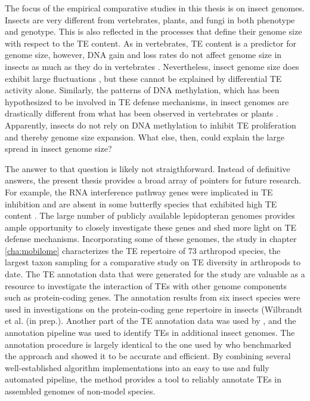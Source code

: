 The focus of the empirical comparative studies in this thesis is on
insect genomes. Insects are very different from vertebrates, plants, and
fungi in both phenotype and genotype. This is also reflected in the
processes that define their genome size with respect to the TE content.
As in vertebrates, TE content is a predictor for genome size, however,
DNA gain and loss rates do not affect genome size in insects as much as
they do in vertebrates \citep{Kapusta2017a, Lindblad-Toh2005}.
Nevertheless, insect genome size does exhibit large fluctuations
\citep{Alfsnes2017}, but these cannot be explained by differential TE
activity alone.  Similarly, the patterns of DNA methylation, which has
been hypothesized to be involved in TE defense mechanisms, in insect
genomes are drastically different from what has been observed in
vertebrates or plants \citep{Provataris2018, Suzuki2008}. Apparently,
insects do not rely on DNA methylation to inhibit TE proliferation and
thereby genome size expansion. What else, then, could explain the large
spread in insect genome size?

The answer to that question is likely not straigthforward. Instead of
definitive answers, the present thesis provides a broad array of
pointers for future research. For example, the RNA interference pathway
genes were implicated in TE inhibition \citep{Aravin2001, Czech2008} and
are absent in some butterfly species that exhibited high TE content
\citep{Dowling2017}. The large number of publicly available lepidopteran
genomes provides ample opportunity to closely investigate these genes
and shed more light on TE defense mechanisms. Incorporating some of
these genomes, the study in chapter \ref{cha:mobilome} characterizes the
TE repertoire of 73 arthropod species, the largest taxon sampling for a
comparative study on TE diversity in arthropods to date. The TE
annotation data that were generated for the study are valuable as a
resource to investigate the interaction of TEs with other genome
components such as protein-coding genes. The annotation results from six
insect species were used in
investigations on the protein-coding gene repertoire in insects
(Wilbrandt et al. (in prep.). Another part of the TE annotation data was
used by \citep{Provataris2018}, and the annotation pipeline was used to
identify TEs in additional insect genomes. The annotation procedure is
largely identical to the one used by \citet{Reinar2016} who benchmarked
the approach and showed it to be accurate and efficient. By combining
several well-established algorithm implementations into an easy to use
and fully automated pipeline, the method provides a tool to reliably
annotate TEs in assembled genomes of non-model species. 


